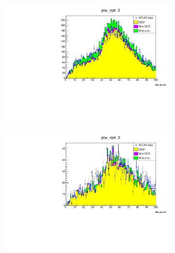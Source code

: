 \begin{figure}
\begin{subfigure}{0.5\textwidth}
        \end{subfigure}
        \begin{subfigure}{0.5\textwidth}
            \includegraphics[width=\textwidth]{../W_mass/ptw_njet2.pdf}
        \end{subfigure}
        \begin{subfigure}{0.5\textwidth}
            \includegraphics[width=\textwidth]{../W_mass/ptw_njet3.pdf}
        \end{subfigure}
        \begin{subfigure}{0.5\textwidth}

\end{subfigure}
\end{figure}
